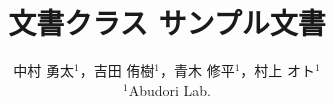 \documentclass[platex,dvipdfmx]{rbproceedings}
\title{\pkg{RBProceedings}文書クラス サンプル文書}
\author{%
中村 勇太${}^{1}$，吉田 侑樹${}^{1}$，青木 修平${}^{1}$，村上 オト${}^{1}$\\
${}^{1}$Abudori Lab.
}
\begin{document}
\maketitle











\cite{JLREQ}



\end{document}
